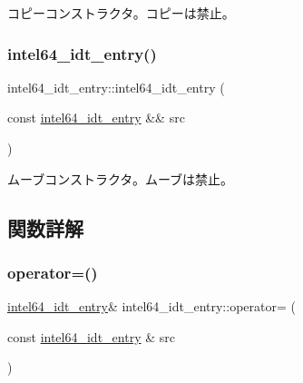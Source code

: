 コピーコンストラクタ。コピーは禁止。 \hypertarget{classintel64__idt__entry_adddc31fcd79f148babda0d866db0cf47}{}\label{classintel64__idt__entry_adddc31fcd79f148babda0d866db0cf47} 
\subsubsection{\texorpdfstring{intel64\+\_\+idt\+\_\+entry()}{intel64\_idt\_entry()}\hspace{0.1cm}{\footnotesize\ttfamily [3/3]}}
{\footnotesize\ttfamily intel64\+\_\+idt\+\_\+entry\+::intel64\+\_\+idt\+\_\+entry (\begin{DoxyParamCaption}\item[{const \hyperlink{classintel64__idt__entry}{intel64\+\_\+idt\+\_\+entry} \&\&}]{src }\end{DoxyParamCaption})\hspace{0.3cm}{\ttfamily [delete]}}

ムーブコンストラクタ。ムーブは禁止。 

\subsection{関数詳解}
\hypertarget{classintel64__idt__entry_ad9f42b19a6d71b708afa406478c0754b}{}\label{classintel64__idt__entry_ad9f42b19a6d71b708afa406478c0754b} 
\subsubsection{\texorpdfstring{operator=()}{operator=()}\hspace{0.1cm}{\footnotesize\ttfamily [1/2]}}
{\footnotesize\ttfamily \hyperlink{classintel64__idt__entry}{intel64\+\_\+idt\+\_\+entry}\& intel64\+\_\+idt\+\_\+entry\+::operator= (\begin{DoxyParamCaption}\item[{const \hyperlink{classintel64__idt__entry}{intel64\+\_\+idt\+\_\+entry} \&}]{src }\end{DoxyParamCaption})\hspace{0.3cm}{\ttfamily [delete]}}

